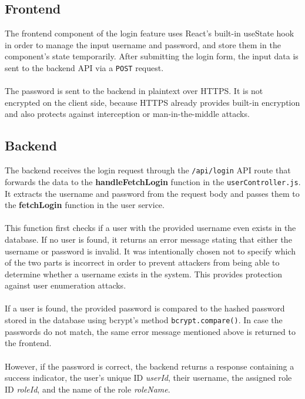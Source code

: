 \documentclass[a4paper,12pt]{report}
\begin{document}
\subsection{Frontend}
The frontend component of the login feature uses React's built-in useState hook in order to manage the input username and password, and store them in the component's state temporarily. After submitting the login form, the input data is sent to the backend API via a \texttt{POST} request. \\\\
The password is sent to the backend in plaintext over HTTPS. It is not encrypted on the client side, because HTTPS already provides built-in encryption and also protects against interception or man-in-the-middle attacks. \\
\subsection{Backend}
The backend receives the login request through the \texttt{/api/login} API route that forwards the data to the \textbf{handleFetchLogin} function in the \texttt{userController.js}. It extracts the username and password from the request body and passes them to the \textbf{fetchLogin} function in the user service. \\\\
This function first checks if a user with the provided username even exists in the database. If no user is found, it returns an error message stating that either the username or password is invalid. It was intentionally chosen not to specify which of the two parts is incorrect in order to prevent attackers from being able to determine whether a username exists in the system. This provides protection against user enumeration attacks. \\\\
If a user is found, the provided password is compared to the hashed password stored in the database using bcrypt's method \texttt{bcrypt.compare()}. In case the passwords do not match, the same error message mentioned above is returned to the frontend. \\\\
However, if the password is correct, the backend returns a response containing a success indicator, the user's unique ID \textit{userId}, their username, the assigned role ID \textit{roleId}, and the name of the role \textit{roleName}. \\
\end{document}
